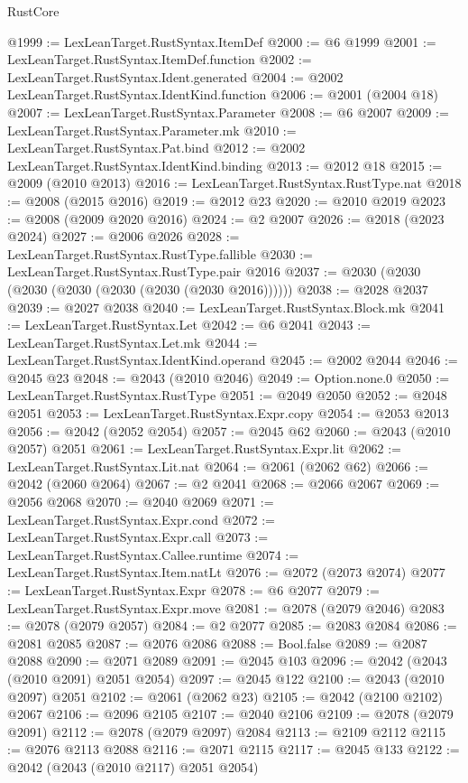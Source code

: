 \begin{lexlean}{RustCore}
\begin{coremodule}
@1999 := LexLeanTarget.RustSyntax.ItemDef
@2000 := @6 @1999
@2001 := LexLeanTarget.RustSyntax.ItemDef.function
@2002 := LexLeanTarget.RustSyntax.Ident.generated
@2004 := @2002 LexLeanTarget.RustSyntax.IdentKind.function
@2006 := @2001 (@2004 @18)
@2007 := LexLeanTarget.RustSyntax.Parameter
@2008 := @6 @2007
@2009 := LexLeanTarget.RustSyntax.Parameter.mk
@2010 := LexLeanTarget.RustSyntax.Pat.bind
@2012 := @2002 LexLeanTarget.RustSyntax.IdentKind.binding
@2013 := @2012 @18
@2015 := @2009 (@2010 @2013)
@2016 := LexLeanTarget.RustSyntax.RustType.nat
@2018 := @2008 (@2015 @2016)
@2019 := @2012 @23
@2020 := @2010 @2019
@2023 := @2008 (@2009 @2020 @2016)
@2024 := @2 @2007
@2026 := @2018 (@2023 @2024)
@2027 := @2006 @2026
@2028 := LexLeanTarget.RustSyntax.RustType.fallible
@2030 := LexLeanTarget.RustSyntax.RustType.pair @2016
@2037 := @2030 (@2030 (@2030 (@2030 (@2030 (@2030 (@2030 @2016))))))
@2038 := @2028 @2037
@2039 := @2027 @2038
@2040 := LexLeanTarget.RustSyntax.Block.mk
@2041 := LexLeanTarget.RustSyntax.Let
@2042 := @6 @2041
@2043 := LexLeanTarget.RustSyntax.Let.mk
@2044 := LexLeanTarget.RustSyntax.IdentKind.operand
@2045 := @2002 @2044
@2046 := @2045 @23
@2048 := @2043 (@2010 @2046)
@2049 := Option.none.{0}
@2050 := LexLeanTarget.RustSyntax.RustType
@2051 := @2049 @2050
@2052 := @2048 @2051
@2053 := LexLeanTarget.RustSyntax.Expr.copy
@2054 := @2053 @2013
@2056 := @2042 (@2052 @2054)
@2057 := @2045 @62
@2060 := @2043 (@2010 @2057) @2051
@2061 := LexLeanTarget.RustSyntax.Expr.lit
@2062 := LexLeanTarget.RustSyntax.Lit.nat
@2064 := @2061 (@2062 @62)
@2066 := @2042 (@2060 @2064)
@2067 := @2 @2041
@2068 := @2066 @2067
@2069 := @2056 @2068
@2070 := @2040 @2069
@2071 := LexLeanTarget.RustSyntax.Expr.cond
@2072 := LexLeanTarget.RustSyntax.Expr.call
@2073 := LexLeanTarget.RustSyntax.Callee.runtime
@2074 := LexLeanTarget.RustSyntax.Item.natLt
@2076 := @2072 (@2073 @2074)
@2077 := LexLeanTarget.RustSyntax.Expr
@2078 := @6 @2077
@2079 := LexLeanTarget.RustSyntax.Expr.move
@2081 := @2078 (@2079 @2046)
@2083 := @2078 (@2079 @2057)
@2084 := @2 @2077
@2085 := @2083 @2084
@2086 := @2081 @2085
@2087 := @2076 @2086
@2088 := Bool.false
@2089 := @2087 @2088
@2090 := @2071 @2089
@2091 := @2045 @103
@2096 := @2042 (@2043 (@2010 @2091) @2051 @2054)
@2097 := @2045 @122
@2100 := @2043 (@2010 @2097) @2051
@2102 := @2061 (@2062 @23)
@2105 := @2042 (@2100 @2102) @2067
@2106 := @2096 @2105
@2107 := @2040 @2106
@2109 := @2078 (@2079 @2091)
@2112 := @2078 (@2079 @2097) @2084
@2113 := @2109 @2112
@2115 := @2076 @2113 @2088
@2116 := @2071 @2115
@2117 := @2045 @133
@2122 := @2042 (@2043 (@2010 @2117) @2051 @2054)

\end{coremodule}
\end{lexlean}
